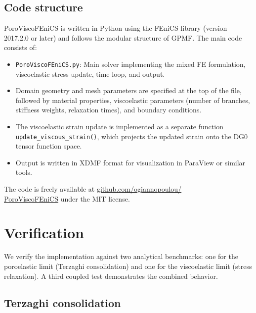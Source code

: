 \documentclass[a4paper,fleqn,longmktitle]{cas-sc}
\begin{document}
\subsection{Code structure}

PoroViscoFEniCS is written in Python using the FEniCS library (version 2017.2.0
or later) and follows the modular structure of GPMF. The main code consists of:

\begin{itemize}
  \item \texttt{PoroViscoFEniCS.py}: Main solver implementing the mixed FE
        formulation, viscoelastic stress update, time loop, and output.
  \item Domain geometry and mesh parameters are specified at the top of the
        file, followed by material properties, viscoelastic parameters (number
        of branches, stiffness weights, relaxation times), and boundary
        conditions.
  \item The viscoelastic strain update is implemented as a separate function
        \texttt{update\_viscous\_strain()}, which projects the updated strain
        onto the DG0 tensor function space.
  \item Output is written in XDMF format for visualization in ParaView or
        similar tools.
\end{itemize}

The code is freely available at
\href{https://github.com/ogiannopoulou/PoroViscoFEniCS}{github.com/ogiannopoulou/\\
PoroViscoFEniCS} under the MIT license.

\section{Verification}
\label{sec:verification}

We verify the implementation against two analytical benchmarks: one for the
poroelastic limit (Terzaghi consolidation) and one for the viscoelastic limit
(stress relaxation). A third coupled test demonstrates the combined behavior.

\subsection{Terzaghi consolidation}
\label{sec:terzaghi}
\end{document}
